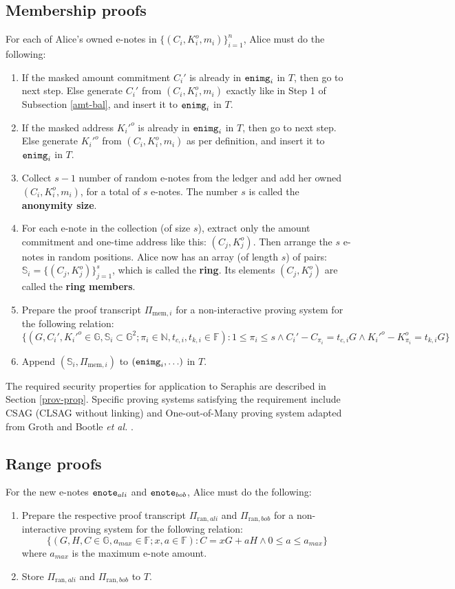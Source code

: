 \documentclass{article}
\begin{document}
\subsection{Membership proofs}\label{mem}
For each of Alice's owned e-notes in $\{(C_i,K_i^o,m_i)\}_{i=1}^n$, Alice must do the following:
\begin{enumerate}
    \item If the masked amount commitment $C_i'$ is already in ${\tt enimg}_i$ in $T$, then go to next step. Else generate $C_i'$ from $(C_i, K_i^o, m_i)$ exactly like in Step 1 of Subsection \ref{amt-bal}, and insert it to ${\tt enimg}_i$ in $T$.
    \item If the masked address $K_i'^o$ is already in ${\tt enimg}_i$ in $T$, then go to next step. Else generate $K_i'^o$ from $(C_i, K_i^o, m_i)$ as per definition, and insert it to ${\tt enimg}_i$ in $T$.
    \item Collect $s-1$ number of random e-notes from the ledger and add her owned $(C_i,K_i^o,m_i)$, for a total of $s$ e-notes. The number $s$ is called the \textbf{anonymity size}.
    \item For each e-note in the collection (of size $s$), extract only the amount commitment and one-time address like this: $(C_j, K_j^o)$. Then arrange the $s$ e-notes in random positions. Alice now has an array (of length $s$) of pairs: $\mathbb{S}_i = \{(C_j, K_j^o)\}_{j=1}^s$, which is called the \textbf{ring}. Its elements $(C_j, K_j^o)$ are called the \textbf{ring members}. 
    \item Prepare the proof transcript $\Pi_{\text{mem}, i}$ for a non-interactive proving system for the following relation:
$$\{(G, C_i', K_i'^o \in\mathbb{G}, \mathbb{S}_i\subset\mathbb{G}^2; \pi_i\in\mathbb{N}, t_{c,i}, t_{k,i}\in\mathbb{F}): 1\le\pi_i\le s \wedge C_i' - C_{\pi_i} = t_{c,i} G \wedge K_i'^o - K_{\pi_i}^o = t_{k,i} G \}$$
    \item Append $(\mathbb{S}_i, \Pi_{\text{mem}, i})$ to $({\tt enimg}_i, \ldots)$ in $T$.
\end{enumerate}
The required security properties for application to Seraphis are described in Section \ref{prov-prop}. Specific proving systems satisfying the requirement include CSAG (CLSAG \cite{clsag} without linking) and One-out-of-Many proving system adapted from Groth and Bootle \textit{et al.} \cite{groth, bootle}.

\subsection{Range proofs}\label{range}
For the new e-notes ${\tt enote}_{ali}$ and ${\tt enote}_{bob}$, Alice must do the following:
\begin{enumerate}
    \item Prepare the respective proof transcript $\Pi_{\text{ran}, ali}$ and $\Pi_{\text{ran}, bob}$ for a non-interactive proving system for the following relation:
$$\{(G, H, C \in\mathbb{G}, a_{max}\in\mathbb{F}; x, a\in\mathbb{F}): C = x G + a H \wedge 0\le a \le a_{max}\}$$
	where $a_{max}$ is the maximum e-note amount.
    \item Store $\Pi_{\text{ran}, ali}$ and $\Pi_{\text{ran}, bob}$ to $T$.
\end{enumerate}
\end{document}
